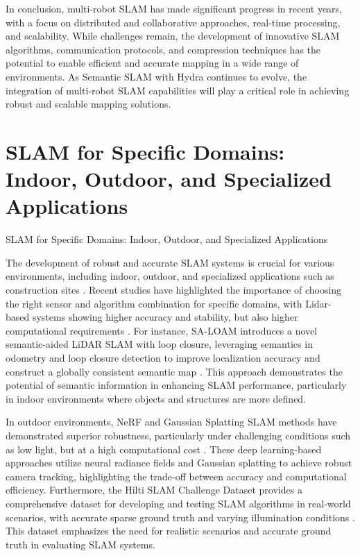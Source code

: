 \documentclass[conference]{IEEEtran}
\begin{document}
In conclusion, multi-robot SLAM has made significant progress in recent years, with a focus on distributed and collaborative approaches, real-time processing, and scalability. While challenges remain, the development of innovative SLAM algorithms, communication protocols, and compression techniques has the potential to enable efficient and accurate mapping in a wide range of environments. As Semantic SLAM with Hydra continues to evolve, the integration of multi-robot SLAM capabilities will play a critical role in achieving robust and scalable mapping solutions.

\section{SLAM for Specific Domains: Indoor, Outdoor, and Specialized Applications}
SLAM for Specific Domains: Indoor, Outdoor, and Specialized Applications

The development of robust and accurate SLAM systems is crucial for various environments, including indoor, outdoor, and specialized applications such as construction sites \cite{b5}. Recent studies have highlighted the importance of choosing the right sensor and algorithm combination for specific domains, with Lidar-based systems showing higher accuracy and stability, but also higher computational requirements \cite{b1}. For instance, SA-LOAM introduces a novel semantic-aided LiDAR SLAM with loop closure, leveraging semantics in odometry and loop closure detection to improve localization accuracy and construct a globally consistent semantic map \cite{b2}. This approach demonstrates the potential of semantic information in enhancing SLAM performance, particularly in indoor environments where objects and structures are more defined.

In outdoor environments, NeRF and Gaussian Splatting SLAM methods have demonstrated superior robustness, particularly under challenging conditions such as low light, but at a high computational cost \cite{b3}. These deep learning-based approaches utilize neural radiance fields and Gaussian splatting to achieve robust camera tracking, highlighting the trade-off between accuracy and computational efficiency. Furthermore, the Hilti SLAM Challenge Dataset provides a comprehensive dataset for developing and testing SLAM algorithms in real-world scenarios, with accurate sparse ground truth and varying illumination conditions \cite{b5}. This dataset emphasizes the need for realistic scenarios and accurate ground truth in evaluating SLAM systems.
\end{document}
